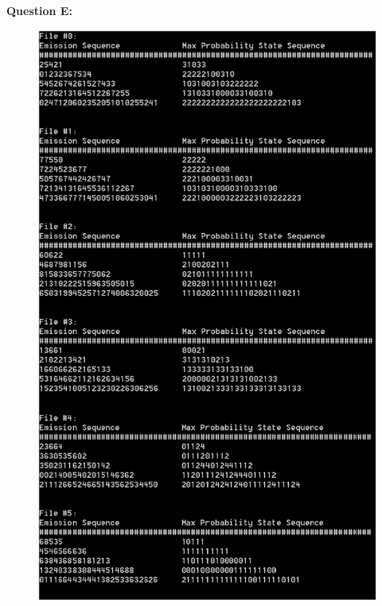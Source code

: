 \documentclass[12 pt]{article}
\begin{document}
	
	\noindent\textbf{Question E:} \\
	\begin{figure}[H]
	\includegraphics[width=13cm]{2E}
	\end{figure}
	
\end{document}
